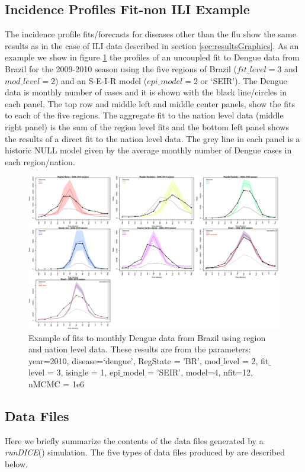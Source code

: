 \documentclass[a4paper]{article}
\begin{document}
\subsection{Incidence Profiles Fit-non ILI Example}
The incidence profile fits/forecasts for diseases other than the flu show the same results as in the case of ILI data described in section \ref{sec:resultsGraphics}. As an example we show in figure \ref{fig:br_dengue} the profiles of an uncoupled fit to Dengue data from Brazil for the 2009-2010 season using the five regions of Brazil ($fit\_level = 3$ and $mod\_level = 2$) and an S-E-I-R model ($epi\_model = 2$ or `SEIR').
The Dengue data is monthly number of cases and it is shown with the black line/circles in each panel.  The top row and middle left and  middle center panels, show the fits to each of the five regions. The aggregate fit to the nation level data (middle right panel) is the sum of the region level fits and the bottom left panel shows the results of a direct fit to the nation level data.  The grey line in each panel is a historic NULL model given by the average monthly number of Dengue cases in each region/nation.
\begin{figure}[htbp]
  \centering
  \includegraphics[width=\linewidth]{figures/BR_2009-2010_SEIR.pdf}
  \caption{Example of fits to monthly Dengue data from Brazil using region and nation level data. These results are from the parameters: year=2010, disease=`dengue', RegState = 'BR', mod$\_$level = 2, fit$\_$level = 3, isingle = 1, epi$\_$model = 'SEIR', model=4, nfit=12, nMCMC = 1e6}
  \label{fig:br_dengue}
\end{figure}

\subsection{Data Files}
Here we briefly summarize the contents of the data files generated by a \textit{runDICE}() simulation.  The five types of data files produced by  are described below.
\end{document}
